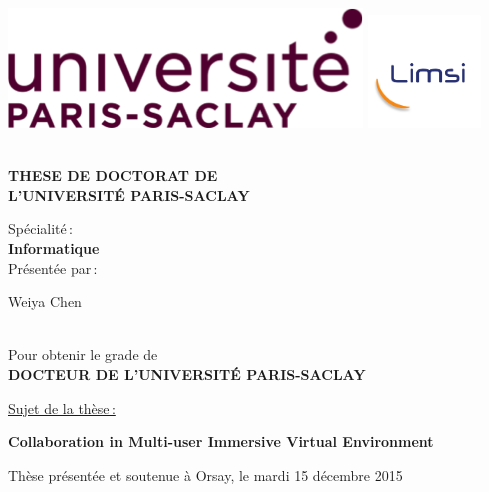 \begin{titlepage}

\includegraphics[height=2.cm]{./logos/logo_saclay}\hfill
\includegraphics[height=3cm]{./logos/LogoLimsi2015}\hfill
\\
\\

\begin{center}
  \begin{Large}
    \textbf{THESE DE DOCTORAT DE\\ L'UNIVERSIT\'E PARIS-SACLAY\\}
  \end{Large}
  Sp\'ecialit\'e\,:\\
  \textbf{Informatique}\\ 
  Pr\'esent\'ee par\,:\\ 
  \begin{LARGE}
    Weiya Chen\end{LARGE}\\
  Pour obtenir le grade de\\
  \textbf{DOCTEUR DE L'UNIVERSIT\'E PARIS-SACLAY}
\end{center}

\noindent \underline{Sujet de la thèse\,:}\\
\begin{center}
  \begin{Large}
    {\textbf{Collaboration in Multi-user Immersive Virtual Environment}}
  \end{Large}
\end{center}

Thèse présentée et soutenue à Orsay, le mardi 15 décembre 2015\\


\end{titlepage}
